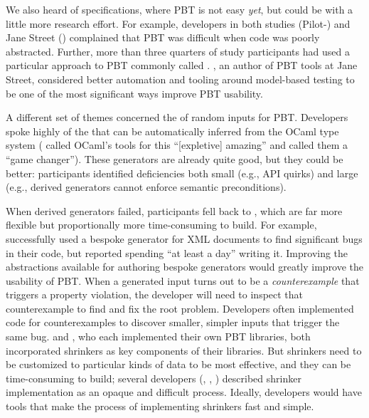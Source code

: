 We also heard  of specifications, where PBT is not easy {\em yet}, but
could be with a little more research effort. For example, developers in
both studies (Pilot-) and Jane Street () complained
that PBT was difficult when code was poorly abstracted.  Further,
more than three
quarters of study participants had used a particular approach to PBT commonly
called .  , an author of PBT tools
at Jane Street, considered better automation and tooling around model-based
testing to be one of the most significant ways improve PBT usability.

A different set of themes concerned the  of
random inputs for PBT. Developers spoke
highly of the  that can be automatically
inferred from
the OCaml type system ( called OCaml's tools for this
``[expletive] amazing'' and  called them a ``game changer'').
These generators are already quite good, but they could be better: participants
identified deficiencies both small (e.g., API quirks) and large (e.g.,
derived generators
cannot enforce semantic preconditions).

When derived generators
failed, participants fell back to , which
are far more flexible but proportionally more time-consuming to
build. For example,  successfully used a bespoke
generator for XML documents to find significant bugs in their code,
but reported spending ``at least a day'' writing it.
Improving the abstractions available for authoring bespoke generators would
greatly improve the usability of PBT.
%
When a generated input turns out to be a {\em counterexample} that triggers
a property violation, the developer will need to inspect that
counterexample to find
and fix the root problem. Developers often implemented code for
 counterexamples to discover smaller,
simpler inputs that trigger the same bug.  
and , who each implemented their own PBT libraries, both
incorporated shrinkers as key components of their libraries. But
shrinkers need to be customized to particular kinds of data to be most
effective, and they can be time-consuming to build; several
developers
(,  , )
described shrinker implementation as an opaque and difficult process.
Ideally, developers would have tools that make the process of implementing
shrinkers fast and simple.

